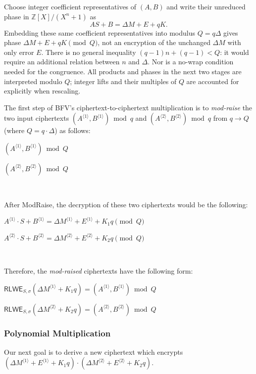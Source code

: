 Choose integer coefficient representatives of $(A,B)$ and write their unreduced phase in $\mathbb Z[X]/(X^n+1)$ as
\[
AS+B=\Delta M+E+qK.
\]
Embedding these same coefficient representatives into modulus $Q=q\Delta$ gives phase $\Delta M+E+qK\pmod Q$, not an encryption of the unchanged $\Delta M$ with only error $E$. There is no general inequality $(q-1)n+(q-1)<Q$: it would require an additional relation between $n$ and $\Delta$. Nor is a no-wrap condition needed for the congruence. All products and phases in the next two stages are interpreted modulo $Q$; integer lifts and their multiples of $Q$ are accounted for explicitly when rescaling.

The first step of BFV's ciphertext-to-ciphertext multiplication is to \textit{mod-raise} the two input ciphertexts $(A^{\langle 1 \rangle}, B^{\langle 1 \rangle}) \bmod q$ and $(A^{\langle 2 \rangle}, B^{\langle 2 \rangle}) \bmod q$  
from $q \rightarrow Q$ (where $Q = q\cdot \Delta$) as follows: 

$(A^{\langle 1 \rangle}, B^{\langle 1 \rangle}) \bmod Q$

$(A^{\langle 2 \rangle}, B^{\langle 2 \rangle}) \bmod Q$

$ $

After \textsf{ModRaise}, the decryption of these two ciphertexts would be the following: 

$A^{\langle 1 \rangle} \cdot S + B^{\langle 1 \rangle} = \Delta M^{\langle 1 \rangle} + E^{\langle 1 \rangle} + K_1q \pmod Q$

$A^{\langle 2 \rangle} \cdot S + B^{\langle 2 \rangle} = \Delta M^{\langle 2 \rangle} + E^{\langle 2 \rangle} + K_2q \pmod Q$


$ $

Therefore, the \textit{mod-raised} ciphertexts have the following form: 

$\textsf{RLWE}_{S, \sigma}(\Delta M^{\langle 1 \rangle} + K_1q) = (A^{\langle 1 \rangle}, B^{\langle 1 \rangle}) \bmod Q$

$\textsf{RLWE}_{S, \sigma}(\Delta M^{\langle 2 \rangle} + K_2q) = (A^{\langle 2 \rangle}, B^{\langle 2 \rangle}) \bmod Q$


\subsubsection{Polynomial Multiplication}
\label{subsubsec:bfv-mult-cipher-multiplication}

Our next goal is to derive a new ciphertext which encrypts 
$(\Delta M^{\langle 1 \rangle} + E^{\langle 1 \rangle} + K_1q) \cdot (\Delta M^{\langle 2 \rangle} + E^{\langle 2 \rangle} + K_2q)$. 


